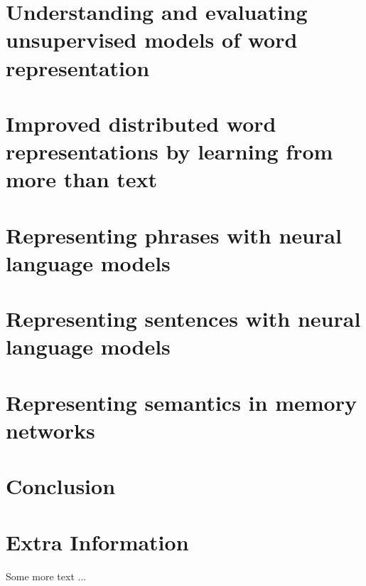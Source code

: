 \documentclass[withindex,glossary]{cam-thesis}
\begin{document}
\chapter{Understanding and evaluating unsupervised models of word representation}

\chapter{Improved distributed word representations by learning from more than text}

\chapter{Representing phrases with neural language models}

\chapter{Representing sentences with neural language models}

\chapter{Representing semantics in memory networks}

\chapter{Conclusion}



\cleardoublepage
{}
{}






\appendix

\chapter{Extra Information}
Some more text ...



\printthesisindex
\end{document}
